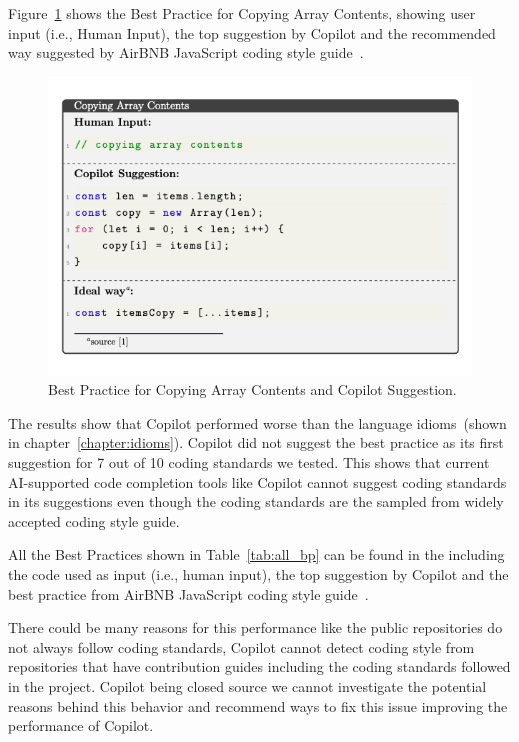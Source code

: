 Figure~\ref{fig:bp_1} shows the Best Practice for Copying Array Contents, showing user input (i.e., Human Input), the top suggestion by Copilot and the recommended way suggested by AirBNB JavaScript coding style guide~\cite{airbnb_code}.

\begin{figure}[hbt!]
    \centering
    \includegraphics[width=\linewidth]{Figures/bp_1.png}
    \caption{Best Practice for Copying Array Contents and Copilot Suggestion.}
    \label{fig:bp_1}
\end{figure}

The results show that Copilot performed worse than the language idioms~(shown in chapter~\ref{chapter:idioms}). Copilot did not suggest the best practice as its first suggestion for 7 out of 10 coding standards we tested. This shows that current AI-supported
code completion tools like Copilot cannot suggest coding standards in its suggestions even though the coding standards are the sampled from widely accepted coding style guide.

All the Best Practices shown in Table~\ref{tab:all_bp} can be found in the \repl{} including the code used as input (i.e., human input), the top suggestion by Copilot and the best practice from AirBNB JavaScript coding style guide~\cite{airbnb_code}.

There could be many reasons for this performance like the public repositories do not always follow coding standards, Copilot cannot detect coding style from repositories that have contribution guides including the coding standards followed in the project. 
Copilot being closed source we cannot investigate the potential reasons behind this behavior and recommend ways to fix this issue improving the performance of Copilot.

